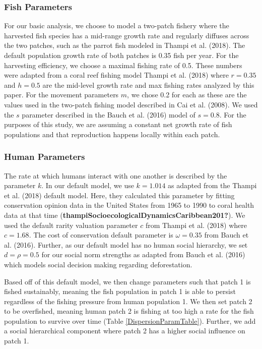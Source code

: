 \documentclass[
  12pt,
]{article}
\begin{document}
\hypertarget{fish-parameters}{%
\subsubsection{Fish Parameters}\label{fish-parameters}}

For our basic analysis, we choose to model a two-patch fishery where the harvested fish species has a mid-range growth rate and regularly diffuses across the two patches, such as the parrot fish modeled in Thampi et al. (2018). The default population growth rate of both patches is 0.35 fish per year. For the harvesting efficiency, we choose a maximal fishing rate of 0.5. These numbers were adapted from a coral reef fishing model Thampi et al. (2018) where \(r = 0.35\) and \(h = 0.5\) are the mid-level growth rate and max fishing rates analyzed by this paper. For the movement parameters \(m\), we chose 0.2 for each as these are the values used in the two-patch fishing model described in Cai et al. (2008). We used the \(s\) parameter described in the Bauch et al. (2016) model of \(s = 0.8\). For the purposes of this study, we are assuming a constant net growth rate of fish populations and that reproduction happens locally within each patch.

\hypertarget{human-parameters}{%
\subsubsection{Human Parameters}\label{human-parameters}}

The rate at which humans interact with one another is described by the parameter \(k\). In our default model, we use \(k = 1.014\) as adapted from the Thampi et al. (2018) default model. Here, they calculated this parameter by fitting conservation opinion data in the United States from 1965 to 1990 to coral health data at that time (\textbf{thampiSocioecologicalDynamicsCaribbean201?}). We used the default rarity valuation parameter \(c\) from Thampi et al. (2018) where \(c = 1.68\). The cost of conservation default parameter is \(\omega = 0.35\) from Bauch et al. (2016). Further, as our default model has no human social hierarchy, we set \(d = \rho = 0.5\) for our social norm strengths as adapted from Bauch et al. (2016) which models social decision making regarding deforestation.

Based off of this default model, we then change parameters such that patch 1 is fished sustainably, meaning the fish population in patch 1 is able to persist regardless of the fishing pressure from human population 1. We then set patch 2 to be overfished, meaning human patch 2 is fishing at too high a rate for the fish population to survive over time (Table \ref{DispersionParamTable}). Further, we add a social hierarchical component where patch 2 has a higher social influence on patch 1.
\end{document}
